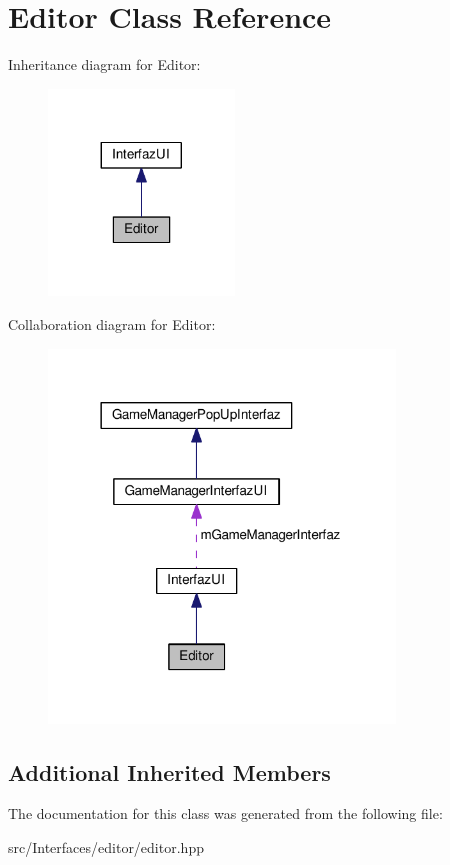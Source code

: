 \hypertarget{class_editor}{}\section{Editor Class Reference}
\label{class_editor}


Inheritance diagram for Editor\+:\nopagebreak
\begin{figure}[H]
\begin{center}
\leavevmode
\includegraphics[width=140pt]{class_editor__inherit__graph}
\end{center}
\end{figure}


Collaboration diagram for Editor\+:\nopagebreak
\begin{figure}[H]
\begin{center}
\leavevmode
\includegraphics[width=261pt]{class_editor__coll__graph}
\end{center}
\end{figure}
\subsection*{Additional Inherited Members}


The documentation for this class was generated from the following file\+:\begin{DoxyCompactItemize}
\item 
src/\+Interfaces/editor/editor.\+hpp\end{DoxyCompactItemize}
